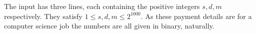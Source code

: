 

The input has three lines, each containing the positive integers
$s, d, m$ respectively. They satisfy $1 \leq s, d, m \leq 
2^{1000}$. As these payment details are for a computer science
job the numbers are all given in binary, naturally.

